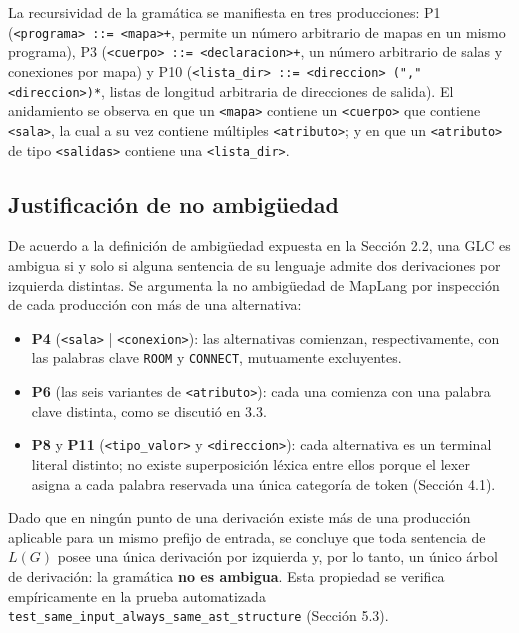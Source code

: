 \documentclass[10pt,twocolumn]{article}
\begin{document}
La recursividad de la gramática se manifiesta en tres producciones: P1
(\texttt{<programa> ::= <mapa>+}, permite un número arbitrario de mapas en
un mismo programa), P3 (\texttt{<cuerpo> ::= <declaracion>+}, un número
arbitrario de salas y conexiones por mapa) y P10
(\texttt{<lista\_dir> ::= <direccion> ("," <direccion>)*}, listas de
longitud arbitraria de direcciones de salida). El anidamiento se observa en
que un \texttt{<mapa>} contiene un \texttt{<cuerpo>} que contiene
\texttt{<sala>}, la cual a su vez contiene múltiples \texttt{<atributo>}; y
en que un \texttt{<atributo>} de tipo \texttt{<salidas>} contiene una
\texttt{<lista\_dir>}.

\subsection{Justificación de no ambigüedad}

De acuerdo a la definición de ambigüedad expuesta en la Sección 2.2, una
GLC es ambigua si y solo si alguna sentencia de su lenguaje admite dos
derivaciones por izquierda distintas. Se argumenta la no ambigüedad de
MapLang por inspección de cada producción con más de una alternativa:

\begin{itemize}[leftmargin=*,itemsep=1pt]
  \item \textbf{P4} (\texttt{<sala>} | \texttt{<conexion>}): las
  alternativas comienzan, respectivamente, con las palabras clave
  \texttt{ROOM} y \texttt{CONNECT}, mutuamente excluyentes.
  \item \textbf{P6} (las seis variantes de \texttt{<atributo>}): cada una
  comienza con una palabra clave distinta, como se discutió en 3.3.
  \item \textbf{P8} y \textbf{P11} (\texttt{<tipo\_valor>} y
  \texttt{<direccion>}): cada alternativa es un terminal literal distinto;
  no existe superposición léxica entre ellos porque el lexer asigna a cada
  palabra reservada una única categoría de token (Sección 4.1).
\end{itemize}

Dado que en ningún punto de una derivación existe más de una producción
aplicable para un mismo prefijo de entrada, se concluye que toda sentencia
de $L(G)$ posee una única derivación por izquierda y, por lo tanto, un
único árbol de derivación: la gramática \textbf{no es ambigua}. Esta
propiedad se verifica empíricamente en la prueba automatizada
\texttt{test\_same\_input\_always\_same\_ast\_structure} (Sección 5.3).
\end{document}
